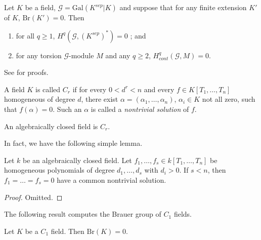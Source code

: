 \begin{proposition}
\label{proposition-serre-galois}
Let $K$ be a field, $\mathcal{G} = \text{Gal}(K^{sep}|K)$ and suppose that for 
any finite extension $K'$ of $K$, $\text{Br}(K') = 0$. Then
\begin{enumerate}
\item
for all $ q \geq 1$, $H^q (\mathcal{G},(K^{sep})^*) = 0$ ; and
\item
for any torsion $\mathcal{G}$-module $M$ and any $q \geq 2$, $H_{cont}^q 
(\mathcal{G},M) = 0$.
\end{enumerate}
\end{proposition}

\noindent
See \cite{SerreGaloisCohomology} for proofs.


\begin{definition}
\label{definition-Cr}
A field $K$ is called {\it $C_r$}
if for every $0 < d^r < n$ and every $f \in K[T_1, 
\ldots, T_n]$ homogeneous of degree $d$, there exist $\alpha = (\alpha_1, 
\ldots, \alpha_n)$, $\alpha_i \in K$ not all zero, such that $f(\alpha) = 0$. 
Such an $\alpha$ is called a {\it nontrivial solution} of $f$.
\end{definition}

\begin{example}
\label{example-algebraically-closed-field-Cr}
An algebraically closed field is $C_r$. 
\end{example}

\noindent
In fact, we have the following simple lemma.

\begin{lemma}
\label{lemma-algebraically-closed-find-solutions}
Let $k$ be an algebraically closed field. Let
$f_1, \ldots, f_s \in k[T_1, \ldots, T_n]$
be homogeneous polynomials of degree $d_1, \ldots, d_s$ with $d_i 
> 0$. If $s < n$, then $f_1 = \ldots = f_s = 0$ have a common nontrivial 
solution.
\end{lemma}

\begin{proof}
Omitted.
\end{proof}

\noindent
The following result computes the Brauer group of $C_1$ fields.

\begin{theorem}
\label{theorem-C1-brauer-group-zero}
Let $K$ be a $C_1$ field. Then $\text{Br}(K) = 0$.
\end{theorem}


